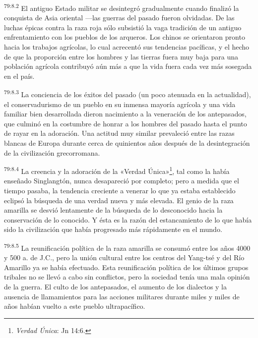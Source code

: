 \par
\textsuperscript{79:8.2} El antiguo Estado militar se desintegró gradualmente cuando finalizó la conquista de Asia oriental ---las guerras del pasado fueron olvidadas. De las luchas épicas contra la raza roja sólo subsistió la vaga tradición de un antiguo enfrentamiento con los pueblos de los arqueros. Los chinos se orientaron pronto hacia los trabajos agrícolas, lo cual acrecentó sus tendencias pacíficas, y el hecho de que la proporción entre los hombres y las tierras fuera muy baja para una población agrícola contribuyó aún más a que la vida fuera cada vez más sosegada en el país.

\par
\textsuperscript{79:8.3} La conciencia de los éxitos del pasado (un poco atenuada en la actualidad), el conservadurismo de un pueblo en su inmensa mayoría agrícola y una vida familiar bien desarrollada dieron nacimiento a la veneración de los antepasados, que culminó en la costumbre de honrar a los hombres del pasado hasta el punto de rayar en la adoración. Una actitud muy similar prevaleció entre las razas blancas de Europa durante cerca de quinientos años después de la desintegración de la civilización grecorromana.

\par
\textsuperscript{79:8.4} La creencia y la adoración de la «Verdad
Única»\footnote{\textit{Verdad
Única}: Jn 14:6.}, tal como la había enseñado Singlangtón, nunca desapareció por completo; pero a medida que el tiempo pasaba, la tendencia creciente a venerar lo que ya estaba establecido eclipsó la búsqueda de una verdad nueva y más elevada. El genio de la raza amarilla se desvió lentamente de la búsqueda de lo desconocido hacia la conservación de lo conocido. Y ésta es la razón del estancamiento de lo que había sido la civilización que había progresado más rápidamente en el mundo.

\par
\textsuperscript{79:8.5} La reunificación política de la raza amarilla se consumó entre los años 4000 y 500 a. de J.C., pero la unión cultural entre los centros del Yang-tsé y del Río Amarillo ya se había efectuado. Esta reunificación política de los últimos grupos tribales no se llevó a cabo sin conflictos, pero la sociedad tenía una mala opinión de la guerra. El culto de los antepasados, el aumento de los dialectos y la ausencia de llamamientos para las acciones militares durante miles y miles de años habían vuelto a este pueblo ultrapacífico.

